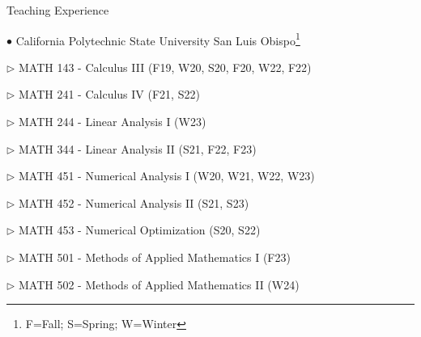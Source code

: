 \documentclass[10pt]{article} %
\newenvironment{outerlist}[1][\enskip\textbullet]%
        {\begin{itemize}[#1]}{\end{itemize}%
         \vspace{-.6\baselineskip}}
\newenvironment{innerlist}[1][\enskip\textbullet]%
        {\begin{compactitem}[#1]}{\end{compactitem}}
\begin{document}
\begin{section}{Teaching Experience}
\begin{outerlist}

\item[$\bullet$] \vskip -7mm 
California Polytechnic State University San Luis Obispo\footnote{\label{note1}F=Fall; S=Spring; W=Winter}
\begin{innerlist}
\item[$\triangleright$] MATH 143 - Calculus III (F19, W20, S20, F20, W22, F22)
\item[$\triangleright$] MATH 241 - Calculus IV (F21, S22)
\item[$\triangleright$] MATH 244 - Linear Analysis I (W23)
\item[$\triangleright$] MATH 344 - Linear Analysis II (S21, F22, F23)
\item[$\triangleright$] MATH 451 - Numerical Analysis I (W20, W21, W22, W23)
\item[$\triangleright$] MATH 452 - Numerical Analysis II (S21, S23)
\item[$\triangleright$] MATH 453 - Numerical Optimization (S20, S22)
\item[$\triangleright$] MATH 501 - Methods of Applied Mathematics I (F23)
\item[$\triangleright$] MATH 502 - Methods of Applied Mathematics II (W24)
\end{innerlist}


\end{outerlist}
\end{section}
\end{document}
